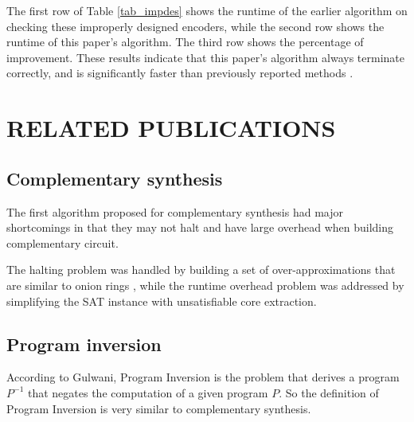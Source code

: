 \documentclass[journal]{IEEEtran}
\begin{document}
The first row of Table \ref{tab_impdes} shows the runtime of the earlier algorithm \cite{ShengYuShen:fmcad10} on checking these improperly designed encoders,
while the second row shows the runtime of this paper's algorithm.
The third row shows the percentage of improvement.
These results indicate that this paper's algorithm always terminate correctly,
and is significantly faster than previously reported methods \cite{ShengYuShen:fmcad10}.


\section{RELATED PUBLICATIONS}\label{sec_relwork}
%
%

\subsection{Complementary synthesis}\label{subsec_compsyn_relat}
The first algorithm proposed for complementary synthesis \cite{ShengYuShen:iccad09} had
major shortcomings in that they may not halt and have large overhead
when building complementary circuit.

The halting problem was handled by building a set of over-approximations that are similar to onion rings \cite{ShengYuShen:fmcad10},
while the runtime overhead problem was addressed by simplifying the SAT instance with unsatisfiable core extraction\cite{ShengYuShen:tcad}.

\subsection{Program inversion}\label{subsec_proinv}
According to Gulwani\cite{dim_syn},
Program Inversion is the problem that derives a program $P^{-1}$
that negates the computation of a given program $P$.
So the definition of Program Inversion is very similar to complementary synthesis.
\end{document}
